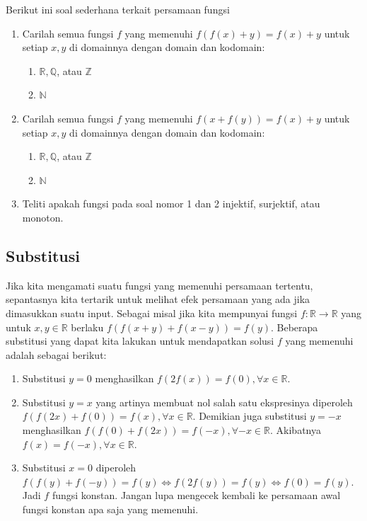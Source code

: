 \documentclass{article}
\begin{document}
Berikut ini soal sederhana terkait persamaan fungsi
\begin{enumerate}
\item Carilah semua fungsi $f$ yang memenuhi $f(f(x)+y) = f(x)+y$ untuk setiap $x, y$ di domainnya dengan domain dan kodomain:
\begin{enumerate}
\item $\mathbb{R}, \mathbb{Q}$, atau $\mathbb{Z}$
\item $\mathbb{N}$
\end{enumerate}
\end{enumerate}



\begin{enumerate}
\setcounter{enumi}{1}
\item Carilah semua fungsi $f$ yang memenuhi $f(x+f(y)) = f(x)+y$ untuk setiap $x, y$ di domainnya dengan domain dan kodomain:
\begin{enumerate}
\item $\mathbb{R}, \mathbb{Q}$, atau $\mathbb{Z}$
\item $\mathbb{N}$
\end{enumerate}
\item Teliti apakah fungsi pada soal nomor 1 dan 2 injektif, surjektif, atau monoton.
\end{enumerate}

\subsection{Substitusi}
Jika kita mengamati suatu fungsi yang memenuhi persamaan tertentu, sepantasnya kita tertarik untuk melihat efek persamaan yang ada jika dimasukkan suatu input. Sebagai misal jika kita mempunyai fungsi $f : \mathbb{R} \rightarrow \mathbb{R}$ yang untuk $x, y \in \mathbb{R}$ berlaku $f(f(x+y)+f(x-y)) = f(y)$. Beberapa substitusi yang dapat kita lakukan untuk mendapatkan solusi $f$ yang memenuhi adalah sebagai berikut:
\begin{enumerate}
\item Substitusi $y = 0$ menghasilkan $f(2f(x)) = f(0), \forall x \in \mathbb{R}$.
\item Substitusi $y = x$ yang artinya membuat nol salah satu ekspresinya diperoleh $f(f(2x)+f(0)) = f(x), \forall x \in \mathbb{R}$. Demikian juga substitusi $y = -x$ menghasilkan $f(f(0)+f(2x)) = f(-x), \forall -x \in \mathbb{R}$. Akibatnya $f(x) = f(-x), \forall x \in \mathbb{R}$.
\item Substitusi $x = 0$ diperoleh $f(f(y)+f(-y)) = f(y) \iff f(2f(y)) = f(y) \iff f(0) = f(y)$. Jadi $f$ fungsi konstan. Jangan lupa mengecek kembali ke persamaan awal fungsi konstan apa saja yang memenuhi.
\end{enumerate}
\end{document}
